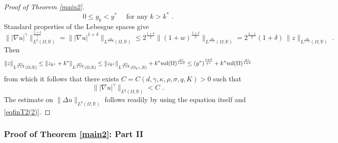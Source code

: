 \documentclass[10pt, a4paper, reqno, oneside]{amsart}
\theoremstyle{plain}
\theoremstyle{definition}
\theoremstyle{plain}
\theoremstyle{definition}
\theoremstyle{plain}
\renewcommand{\=}{:=}
\begin{document}
\begin{proof}[Proof of Theorem \ref{main2}]
$$
0 \leq y_k < y^* \quad \text{ for any } k>k^* \,\, .
$$
Standard properties of the Lebesgue spaces give
$$
\||\nabla u|^\gamma\|_{L^q(\Omega,\mathbb{R})}^{\frac{1+\delta}{\gamma}} =
\||\nabla u|^{1+\delta}\|_{L^{\frac{\gamma q}{1+\delta}}(\Omega,\mathbb{R})} \leq
2^{\frac{1+\delta}2} \|(1+w)^{\frac{1+\delta}2}\|_{L^{\frac{\gamma q}{1+\delta}}(\Omega,\mathbb{R})} =
2^{\frac{\delta-1}2}(1+\delta)\,\|z\|_{L^{\frac{\gamma q}{1+\delta}}(\Omega,\mathbb{R})} \,\, .
$$
Then
\begin{equation} \label{eqfinT2(1)}
\|z\|_{L^{\frac{q\gamma}{1+\delta}}(\Omega,\mathbb{R})} \leq
\|z_{k^*}+k^*\|_{L^{\frac{q\gamma}{1+\delta}}(\Omega,\mathbb{R})} \leq
\|z_{k^*}\|_{L^{\frac{q\gamma}{1+\delta}}(\Omega_{k^*},\mathbb{R})}+k^*{\rm vol}(\Omega)^{\frac{q\gamma}{1+\delta}} \leq (y^*)^{\frac{1+\delta}{q\gamma}} +k^*{\rm vol}(\Omega)^{\frac{q\gamma}{1+\delta}}
\end{equation}
from which it follows that there exists $C=C(d,\gamma,\kappa,\rho,\sigma,q,K)>0$ such that
\begin{equation} \label{eqfinT2(2)}
\||\nabla u|^\gamma\|_{L^q(\Omega,\mathbb{R})} < C \,\, .
\end{equation}
The estimate on $\|\Delta u\|_{L^q(\Omega,\mathbb{R})}$ follows readily by using the equation itself and \eqref{eqfinT2(2)}.
\end{proof}

\subsubsection{Proof of Theorem \ref{main2}: Part II} \hfill \par
\end{document}
